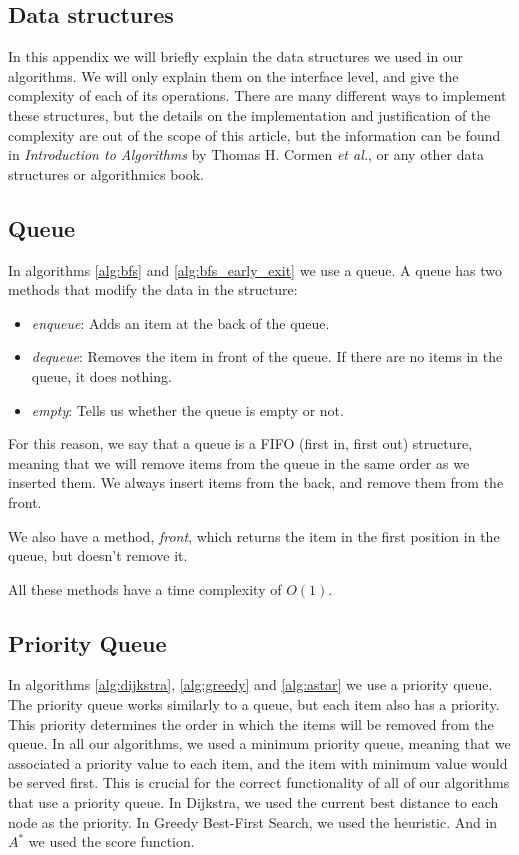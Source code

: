 \documentclass[12pt]{report}
\begin{document}
\begin{appendices}

\chapter{Data structures}

In this appendix we will briefly explain the data structures we used in our algorithms. We will only explain them on the interface level, and give the complexity of each of its operations. There are many different ways to implement these structures, but the details on the implementation and justification of the complexity are out of the scope of this article, but the information can be found in \emph{Introduction to Algorithms} by Thomas H. Cormen \textit{et al.}, or any other data structures or algorithmics book.

\section{Queue}
In algorithms \ref{alg:bfs} and \ref{alg:bfs_early_exit} we use a queue. A queue has two methods that modify the data in the structure:
\begin{itemize}
\item \emph{enqueue}: Adds an item at the back of the queue.
\item \emph{dequeue}: Removes the item in front of the queue. If there are no items in the queue, it does nothing.
\item \emph{empty}: Tells us whether the queue is empty or not.
\end{itemize}
For this reason, we say that a queue is a FIFO (first in, first out) structure, meaning that we will remove items from the queue in the same order as we inserted them. We always insert items from the back, and remove them from the front.

We also have a method, \emph{front}, which returns the item in the first position in the queue, but doesn't remove it.

All these methods have a time complexity of $O(1)$.

\section{Priority Queue}
In algorithms \ref{alg:dijkstra}, \ref{alg:greedy} and \ref{alg:astar} we use a priority queue. The priority queue works similarly to a queue, but each item also has a priority. This priority determines the order in which the items will be removed from the queue. In all our algorithms, we used a minimum priority queue, meaning that we associated a priority value to each item, and the item with minimum value would be served first. This is crucial for the correct functionality of all of our algorithms that use a priority queue. In Dijkstra, we used the current best distance to each node as the priority. In Greedy Best-First Search, we used the heuristic. And in $A^*$ we used the score function.


\end{appendices}
\end{document}
